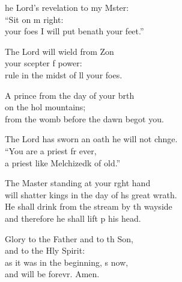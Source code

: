 \settowidth{\versewidth}{will shatter kings in the day of his great wrath.}
\begin{psalmverse}%
  \begin{patverse}
he Lord’s revelation to my Mster:\Flex\\
“Sit on m right:\Med\\
your foes I will put benath your feet.”

The Lord will wield from Z\pointup{\i}on\Flex\\
your scepter f power:\Med\\
rule in the midst of ll your foes.

A prince from the day of your b\pointup{\i}rth\Flex\\
on the hol mountains;\Med\\
from the womb before the dawn  begot you.

The Lord has sworn an oath he will not chnge.\Flex\\
“You are a priest fr ever,\Med\\
a priest like Melchizedk of old.”

The Master standing at your r\pointup{\i}ght hand\Med\\
will shatter kings in the day of h\pointup{\i}s great wrath.\\
He shall drink from the stream by th wayside\Med\\
and therefore he shall lift p his head.

Glory to the Father and to th Son,\Med\\
and to the Hly Spirit:\\
as it was in the beginning, \pointup{\i}s now,\Med\\
and will be forevr. Amen.
  \end{patverse}
\end{psalmverse}
